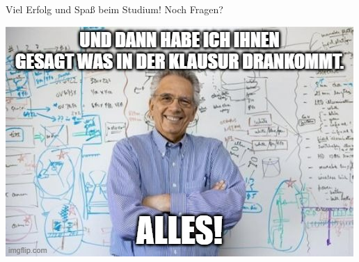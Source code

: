 \documentclass[10pt,a4paper]{beamer}
\begin{document}
    \begin{frame}
        \vfill
        \begin{center}
            \huge{Viel Erfolg und Spaß beim Studium!}
            \vfill
            \huge{Noch Fragen?}
        \end{center}
        \vfill
        \begin{flushright}
            \includegraphics[width=.4\textwidth]{bilder/meme.jpg}
        \end{flushright}
    \end{frame}
\end{document}

